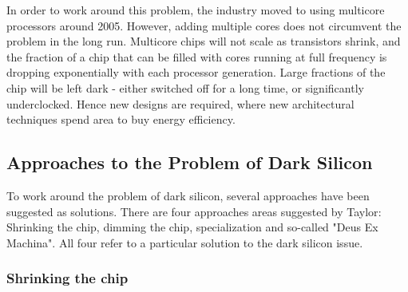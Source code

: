In order to work around this problem, the industry moved to using multicore processors around 2005.
However, adding multiple cores does not circumvent the problem in the long run.
Multicore chips will not scale as transistors shrink, and the fraction of a chip that can be filled with cores running at full frequency is dropping exponentially with each processor generation. 
Large fractions of the chip will be left dark - either switched off for a long time, or significantly underclocked.
Hence new designs are required, where new architectural techniques spend area to buy energy efficiency. \cite{dark-silicon}

\subsection{Approaches to the Problem of Dark Silicon}
\label{sec:taylor}

To work around the problem of dark silicon, several approaches have been suggested as solutions.
There are four approaches areas suggested by Taylor\cite{dark-silicon}: Shrinking the chip, dimming the chip, specialization and so-called "Deus Ex Machina".
All four refer to a particular solution to the dark silicon issue.



\subsubsection{Shrinking the chip}

